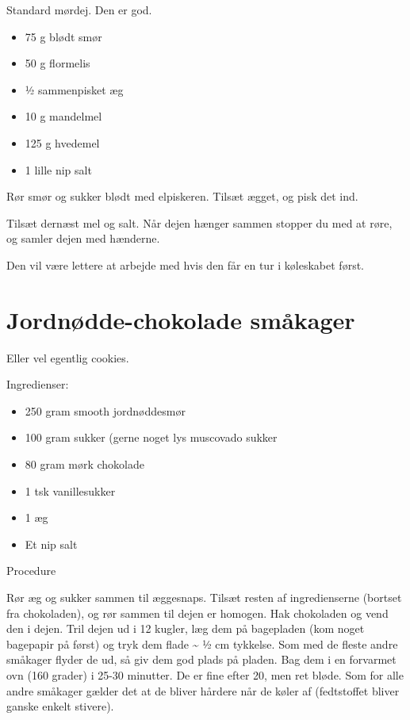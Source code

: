 \documentclass[
]{book}
\providecommand{\tightlist}{%
  \setlength{\itemsep}{0pt}\setlength{\parskip}{0pt}}
\begin{document}
Standard mørdej. Den er god.

\begin{itemize}
\tightlist
\item
  75 g blødt smør
\item
  50 g flormelis
\item
  1⁄2 sammenpisket æg
\item
  10 g mandelmel
\item
  125 g hvedemel
\item
  1 lille nip salt
\end{itemize}

Rør smør og sukker blødt med elpiskeren. Tilsæt ægget, og pisk det ind.

Tilsæt dernæst mel og salt. Når dejen hænger sammen stopper du med at røre, og samler dejen med hænderne.

Den vil være lettere at arbejde med hvis den får en tur i køleskabet først.

\section{Jordnødde-chokolade småkager}\label{jordnuxf8dde-chokolade-smuxe5kager}

Eller vel egentlig cookies.

Ingredienser:

\begin{itemize}
\tightlist
\item
  250 gram smooth jordnøddesmør
\item
  100 gram sukker (gerne noget lys muscovado sukker
\item
  80 gram mørk chokolade
\item
  1 tsk vanillesukker
\item
  1 æg
\item
  Et nip salt
\end{itemize}

Procedure

Rør æg og sukker sammen til æggesnaps.
Tilsæt resten af ingredienserne (bortset fra chokoladen), og rør sammen til dejen er homogen.
Hak chokoladen og vend den i dejen.
Tril dejen ud i 12 kugler, læg dem på bagepladen (kom noget bagepapir på først) og tryk dem flade \textasciitilde{} ½ cm tykkelse.
Som med de fleste andre småkager flyder de ud, så giv dem god plads på pladen.
Bag dem i en forvarmet ovn (160 grader) i 25-30 minutter. De er fine efter 20, men ret bløde. Som for alle andre småkager gælder det at de bliver hårdere når de køler af (fedtstoffet bliver ganske enkelt stivere).
\end{document}
